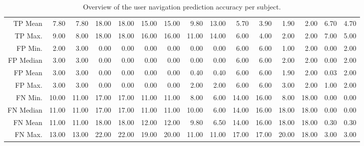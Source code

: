 \begin{table}[ht]
\begin{tabular}{rrrrrrrrrrrrrrr}
  TP Mean & 7.80 & 7.80 & 18.00 & 18.00 & 15.00 & 15.00 & 9.80 & 13.00 & 5.70 & 3.90 & 1.90 & 2.00 & 6.70 & 4.70 \\ 
  TP Max. & 9.00 & 8.00 & 18.00 & 18.00 & 16.00 & 16.00 & 11.00 & 14.00 & 6.00 & 4.00 & 2.00 & 2.00 & 7.00 & 5.00 \\ 
  FP Min. & 2.00 & 3.00 & 0.00 & 0.00 & 0.00 & 0.00 & 0.00 & 0.00 & 6.00 & 6.00 & 1.00 & 2.00 & 0.00 & 2.00 \\ 
  FP Median & 3.00 & 3.00 & 0.00 & 0.00 & 0.00 & 0.00 & 0.00 & 0.00 & 6.00 & 6.00 & 2.00 & 2.00 & 0.00 & 2.00 \\ 
  FP Mean & 3.00 & 3.00 & 0.00 & 0.00 & 0.00 & 0.00 & 0.40 & 0.40 & 6.00 & 6.00 & 1.90 & 2.00 & 0.03 & 2.00 \\ 
  FP Max. & 3.00 & 3.00 & 0.00 & 0.00 & 0.00 & 0.00 & 2.00 & 2.00 & 6.00 & 6.00 & 3.00 & 2.00 & 1.00 & 2.00 \\ 
  FN Min. & 10.00 & 11.00 & 17.00 & 17.00 & 11.00 & 11.00 & 8.00 & 6.00 & 14.00 & 16.00 & 8.00 & 18.00 & 0.00 & 0.00 \\ 
  FN Median & 11.00 & 11.00 & 17.00 & 17.00 & 11.00 & 11.00 & 10.00 & 6.00 & 14.00 & 16.00 & 18.00 & 18.00 & 0.00 & 0.00 \\ 
  FN Mean & 11.00 & 11.00 & 18.00 & 18.00 & 12.00 & 12.00 & 9.80 & 6.50 & 14.00 & 16.00 & 18.00 & 18.00 & 0.30 & 0.30 \\ 
  FN Max. & 13.00 & 13.00 & 22.00 & 22.00 & 19.00 & 20.00 & 11.00 & 11.00 & 17.00 & 17.00 & 20.00 & 18.00 & 3.00 & 3.00 \\ 
   \hline
\end{tabular}
\caption{Overview of the user navigation prediction accuracy per subject.} 
\label{tab:results:rq4:summary:subject}
\end{table}
